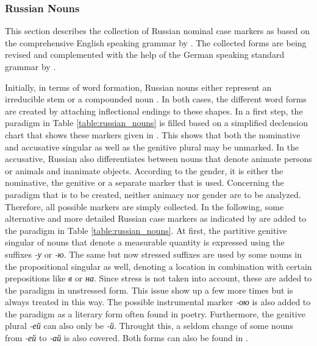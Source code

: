\documentclass[11pt,a4paper,twoside,openright]{scrbook}
\begin{document}
\subsubsection{Russian Nouns}

This section describes the collection of Russian nominal case markers as based on the comprehensive English speaking grammar by \citet{wade2020russ}. The collected forms are being revised and complemented with the help of the German speaking  standard grammar by \citet{kohls2009russ}.

Initially, in terms of word formation, Russian nouns either represent an irreducible stem or a compounded noun \citep{wade2020russ}. In both cases, the different word forms are created by attaching inflectional endings to these shapes. In a first step, the paradigm in Table \ref{table:russian_nouns} is filled based on a simplified declension chart that shows these markers given in \citet{wade2020russ}. This shows that both the nominative and accusative singular as well as the genitive plural may be unmarked. In the accusative, Russian also differentiates between nouns that denote animate persons or animals and inanimate objects. According to the gender, it is either the nominative, the genitive or a separate marker that is used. Concerning the paradigm that is to be created, neither animacy nor gender are to be analyzed. Therefore, all possible markers are simply collected.  
In the following, some alternative and more detailed Russian case markers as indicated by \citet{wade2020russ} are added to the paradigm in Table \ref{table:russian_nouns}. At first, the partitive genitive singular of nouns that denote a measurable quantity is  expressed using the suffixes \foreignlanguage{russian}{\textit{-у} or \textit{-ю}}. 
The same but now stressed suffixes are used by some nouns in the propositional singular as well, denoting a location in combination with certain prepositions like \foreignlanguage{russian}{\textit{в} or \textit{на}}. Since stress is not taken into account, these are added to the paradigm in unstressed form. This issue show up a few more times but is always treated in this way. The possible instrumental marker \foreignlanguage{russian}{\textit{-ою}} is also added to the paradigm as a literary form often found in poetry. Furthermore, the genitive plural \foreignlanguage{russian}{\textit{-ей}} can also only be \foreignlanguage{russian}{\textit{-й}}. Throught this, a seldom change of some nouns from \foreignlanguage{russian}{\textit{-ей} to \textit{-ай}} is also covered. Both forms can also be found in \citet{kohls2009russ}.
\end{document}
